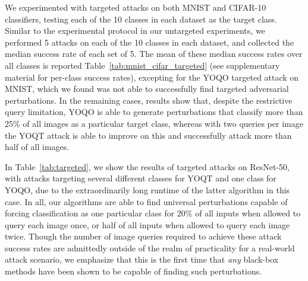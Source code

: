 \documentclass[letterpaper]{article}
\begin{document}
	
	We experimented with targeted attacks on both MNIST and CIFAR-10 classifiers, testing each of the 10 classes in each dataset as the target class. Similar to the experimental protocol in our untargeted experiments, we performed 5 attacks on each of the 10 classes in each dataset, and collected the median success rate of each set of 5. The mean of these median success rates over all classes is reported Table~\ref{tab:mnist_cifar_targeted} (see supplementary material for per-class success rates), excepting for the YOQO targeted attack on MNIST, which we found was not able to successfully find targeted adversarial perturbations. In the remaining cases, results show that, despite the restrictive query limitation, YOQO is able to generate perturbations that classify more than 25\% of all images as a particular target class, whereas with two queries per image the YOQT attack is able to improve on this and successfully attack more than half of all images.
	
	
	In Table~\ref{tab:targeted}, we show the results of targeted attacks on ResNet-50, with attacks targeting several different classes for YOQT and one class for YOQO, due to the extraordinarily long runtime of the latter algorithm in this case. In all, our algorithms are able to find universal perturbations capable of forcing classification as one particular class for 20\% of all inputs when allowed to query each image once, or half of all inputs when allowed to query each image twice. Though the number of image queries required to achieve these attack success rates are admittedly outside of the realm of practicality for a real-world attack scenario, we emphasize that this is the first time that \textit{any} black-box methods have been shown to be capable of finding such perturbations.
	
\end{document}
